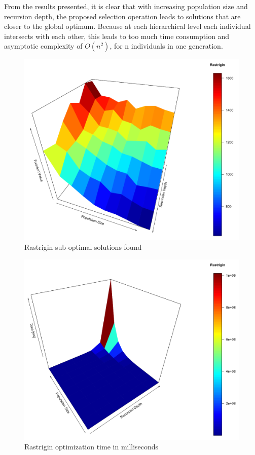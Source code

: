 \documentclass[graybox]{styles/svmult}
\begin{document}
From the results presented, it is clear that with increasing population size and recursion depth, the proposed selection operation leads to solutions that are closer to the global optimum. Because at each hierarchical level each individual intersects with each other, this leads to too much time consumption and asymptotic complexity of $O(n^2)$, for n individuals in one generation.

\begin{figure}[b]
\sidecaption
\includegraphics[width=1.0\textwidth]{images/fig03}
\caption{Rastrigin sub-optimal solutions found}
\label{fig:10}
\end{figure}

\begin{figure}[b]
\sidecaption
\includegraphics[width=1.0\textwidth]{images/fig04}
\caption{Rastrigin optimization time in milliseconds}
\label{fig:11}
\end{figure}
\end{document}
